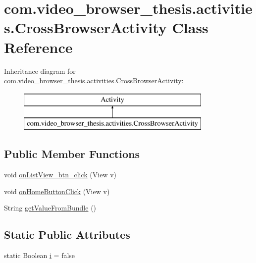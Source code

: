 \hypertarget{classcom_1_1video__browser__thesis_1_1activities_1_1_cross_browser_activity}{\section{com.\-video\-\_\-browser\-\_\-thesis.\-activities.\-Cross\-Browser\-Activity Class Reference}
\label{classcom_1_1video__browser__thesis_1_1activities_1_1_cross_browser_activity}
}
Inheritance diagram for com.\-video\-\_\-browser\-\_\-thesis.\-activities.\-Cross\-Browser\-Activity\-:\begin{figure}[H]
\begin{center}
\leavevmode
\includegraphics[height=2.000000cm]{classcom_1_1video__browser__thesis_1_1activities_1_1_cross_browser_activity}
\end{center}
\end{figure}
\subsection*{Public Member Functions}
\begin{DoxyCompactItemize}
\item 
void \hyperlink{classcom_1_1video__browser__thesis_1_1activities_1_1_cross_browser_activity_a51ffd26afdbacad151c135e00a0ebdc0}{on\-List\-View\-\_\-btn\-\_\-click} (View v)
\item 
void \hyperlink{classcom_1_1video__browser__thesis_1_1activities_1_1_cross_browser_activity_aa050151e4694cd4f165c4038cf9a97ff}{on\-Home\-Button\-Click} (View v)
\item 
String \hyperlink{classcom_1_1video__browser__thesis_1_1activities_1_1_cross_browser_activity_a43ed95e3f7231bf54370a66bf7061e08}{get\-Value\-From\-Bundle} ()
\end{DoxyCompactItemize}
\subsection*{Static Public Attributes}
\begin{DoxyCompactItemize}
\item 
static Boolean \hyperlink{classcom_1_1video__browser__thesis_1_1activities_1_1_cross_browser_activity_a8b4e9b1b0b2fe461d754ec3f97229ff1}{i} = false
\end{DoxyCompactItemize}
